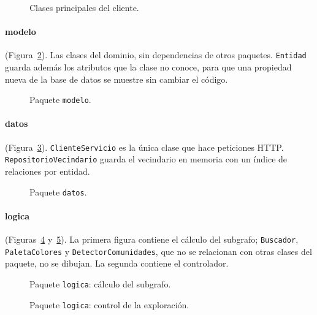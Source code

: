 \begin{figure}[htbp]
  \centering
  \caption{Clases principales del cliente.}
  \label{fig:clases-cliente}
\end{figure}

\paragraph{modelo} (Figura~\ref{fig:clases-modelo}). Las clases del dominio, sin dependencias de otros paquetes. \texttt{Entidad} guarda además los atributos que la clase no conoce, para que una propiedad nueva de la base de datos se muestre sin cambiar el código.

\begin{figure}[htbp]
  \centering
  \caption{Paquete \texttt{modelo}.}
  \label{fig:clases-modelo}
\end{figure}

\paragraph{datos} (Figura~\ref{fig:clases-datos}). \texttt{ClienteServicio} es la única clase que hace peticiones HTTP. \texttt{RepositorioVecindario} guarda el vecindario en memoria con un índice de relaciones por entidad.

\begin{figure}[htbp]
  \centering
  \caption{Paquete \texttt{datos}.}
  \label{fig:clases-datos}
\end{figure}

\paragraph{logica} (Figuras~\ref{fig:clases-logica-subgrafo} y~\ref{fig:clases-logica-control}). La primera figura contiene el cálculo del subgrafo; \texttt{Buscador}, \texttt{PaletaColores} y \texttt{DetectorComunidades}, que no se relacionan con otras clases del paquete, no se dibujan. La segunda contiene el controlador.

\begin{figure}[htbp]
  \centering
  \caption{Paquete \texttt{logica}: cálculo del subgrafo.}
  \label{fig:clases-logica-subgrafo}
\end{figure}

\begin{figure}[htbp]
  \centering
  \caption{Paquete \texttt{logica}: control de la exploración.}
  \label{fig:clases-logica-control}
\end{figure}

